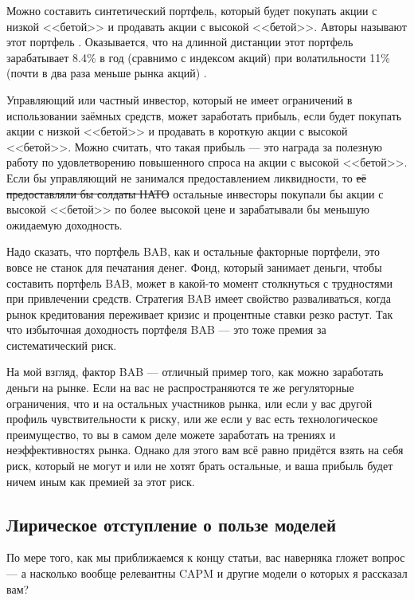 Можно составить синтетический портфель, который будет покупать акции с низкой 
<<бетой>> и продавать акции с высокой <<бетой>>. Авторы называют этот портфель
. Оказывается, что на 
длинной дистанции этот портфель зарабатывает 8.4\% в год (сравнимо с индексом 
акций) при волатильности 11\% (почти в два раза меньше рынка акций)
\cite{frazzini2014betting}.

Управляющий или частный инвестор, который не имеет ограничений в использовании 
заёмных средств, может заработать прибыль, если будет покупать акции с низкой 
<<бетой>> и продавать в короткую акции с высокой <<бетой>>. Можно считать, что 
такая прибыль --- это награда за полезную работу по удовлетворению повышенного 
спроса на акции с высокой <<бетой>>. Если бы управляющий не занимался 
предоставлением ликвидности, то \sout{её предоставляли бы солдаты НАТО} 
остальные инвесторы покупали бы акции с высокой <<бетой>> по более высокой цене 
и зарабатывали бы меньшую ожидаемую доходность.

Надо сказать, что портфель BAB, как и остальные факторные портфели, это вовсе не
станок для печатания денег. Фонд, который занимает деньги, чтобы составить 
портфель BAB, может в какой-то момент столкнуться с трудностями при привлечении
средств. Стратегия BAB имеет свойство разваливаться, когда рынок кредитования
переживает кризис и процентные ставки резко растут. Так что избыточная 
доходность портфеля BAB --- это тоже премия за систематический риск.

На мой взгляд, фактор BAB --- отличный пример того, как можно заработать деньги 
на рынке. Если на вас не распространяются те же регуляторные ограничения, что и
на остальных участников рынка, или если у вас другой профиль чувствительности к
риску, или же если у вас есть технологическое преимущество, то вы в самом деле 
можете заработать на трениях и неэффективностях рынка. Однако для этого 
вам всё равно придётся взять на себя риск, который не могут и или не хотят 
брать остальные, и ваша прибыль будет ничем иным как премией за этот риск.

\subsection{Лирическое отступление о пользе моделей}

По мере того, как мы приближаемся к концу статьи, вас наверняка гложет вопрос --- а насколько вообще релевантны CAPM и другие модели о которых я рассказал вам?

